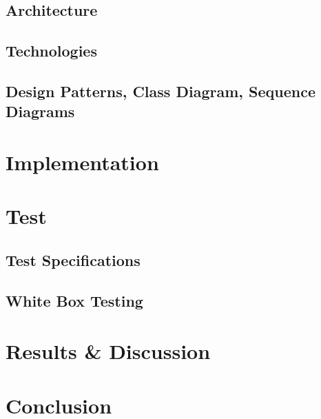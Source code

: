 \documentclass[paper=a4, fontsize=12pt,DIV=14]{scrartcl}    %
\begin{document}
        	\subsection{Architecture}
        	\subsection{Technologies}
        	\subsection{Design Patterns, Class Diagram, Sequence Diagrams}


    \newpage
        \section{Implementation}



    \newpage
        \section{Test}
        	\subsection{Test Specifications}
        	\subsection{White Box Testing}



    \newpage
        \section{Results \& Discussion}



    \newpage
        \section{Conclusion}



\end{document}
